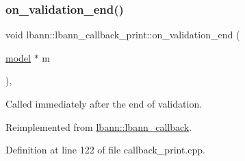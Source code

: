\subsubsection{\texorpdfstring{on\+\_\+validation\+\_\+end()}{on\_validation\_end()}}
{\footnotesize\ttfamily void lbann\+::lbann\+\_\+callback\+\_\+print\+::on\+\_\+validation\+\_\+end (\begin{DoxyParamCaption}\item[{\hyperlink{classlbann_1_1model}{model} $\ast$}]{m }\end{DoxyParamCaption})\hspace{0.3cm}{\ttfamily [override]}, {\ttfamily [virtual]}}

Called immediately after the end of validation. 

Reimplemented from \hyperlink{classlbann_1_1lbann__callback_adc16e42e5064dc2dc8d84dfbfc1325eb}{lbann\+::lbann\+\_\+callback}.



Definition at line 122 of file callback\+\_\+print.\+cpp.


